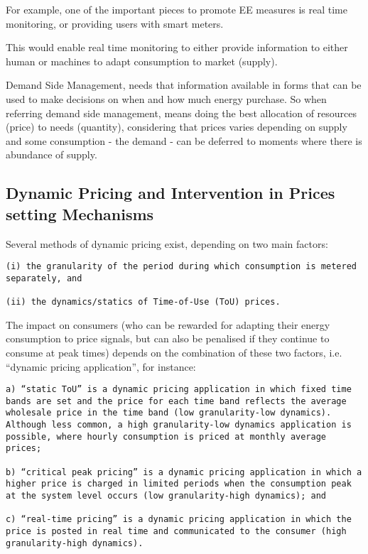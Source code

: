 \documentclass[]{book}
\theoremstyle{definition}
\theoremstyle{definition}
\theoremstyle{definition}
\theoremstyle{remark}
\begin{document}
For example, one of the important pieces to promote EE measures is real
time monitoring, or providing users with smart meters.

This would enable real time monitoring to either provide information to
either human or machines to adapt consumption to market (supply).

Demand Side Management, needs that information available in forms that
can be used to make decisions on when and how much energy purchase. So
when referring demand side management, means doing the best allocation
of resources (price) to needs (quantity), considering that prices varies
depending on supply and some consumption - the demand - can be deferred
to moments where there is abundance of supply.

\subsection{Dynamic Pricing and Intervention in Prices setting
Mechanisms}\label{dynamic-pricing-and-intervention-in-prices-setting-mechanisms}

Several methods of dynamic pricing exist, depending on two main factors:

\begin{verbatim}
(i) the granularity of the period during which consumption is metered separately, and

(ii) the dynamics/statics of Time-of-Use (ToU) prices.
\end{verbatim}

The impact on consumers (who can be rewarded for adapting their energy
consumption to price signals, but can also be penalised if they continue
to consume at peak times) depends on the combination of these two
factors, i.e. ``dynamic pricing application'', for instance:

\begin{verbatim}
a) “static ToU” is a dynamic pricing application in which fixed time bands are set and the price for each time band reflects the average wholesale price in the time band (low granularity-low dynamics). Although less common, a high granularity-low dynamics application is possible, where hourly consumption is priced at monthly average prices;

b) “critical peak pricing” is a dynamic pricing application in which a higher price is charged in limited periods when the consumption peak at the system level occurs (low granularity-high dynamics); and

c) “real-time pricing” is a dynamic pricing application in which the price is posted in real time and communicated to the consumer (high granularity-high dynamics).
\end{verbatim}
\end{document}
